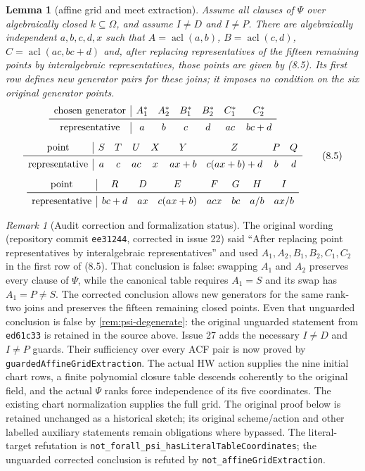 \documentclass[11pt,oneside]{article}
\newtheorem{lemma}[theorem]{Lemma}
\theoremstyle{definition}
\theoremstyle{remark}
\newtheorem{remark}[theorem]{Remark}
\newcommand{\acl}{\operatorname{acl}}
\newcommand{\lean}[1]{\nolinkurl{#1}}
\begin{document}
\begin{lemma}[affine grid and meet extraction]\label{lem:affine-grid-extraction}
Assume all clauses of $\Psi$ over algebraically closed $k\subseteq\Omega$,
and assume $I\ne D$ and $I\ne P$.
There are algebraically independent $a,b,c,d,x$ such that
$A=\acl(a,b)$, $B=\acl(c,d)$, $C=\acl(ac,bc+d)$ and, after replacing
representatives of the fifteen remaining points by interalgebraic representatives,
those points are given by (8.5).  Its first row defines new generator pairs for
these joins; it imposes no condition on the six original generator points.
\[
\begin{gathered}
\begin{array}{c|cccccc}
\text{chosen generator}&A_1^*&A_2^*&B_1^*&B_2^*&C_1^*&C_2^*\\ \midrule
\text{representative}&a&b&c&d&ac&bc+d
\end{array}\\[1.5mm]
\begin{array}{c|cccccccc}
\text{point}&S&T&U&X&Y&Z&P&Q\\ \midrule
\text{representative}&a&c&ac&x&ax+b&c(ax+b)+d&b&d
\end{array}\\[1.5mm]
\begin{array}{c|ccccccc}
\text{point}&R&D&E&F&G&H&I\\ \midrule
\text{representative}&bc+d&ax&c(ax+b)&acx&bc&a/b&ax/b
\end{array}
\end{gathered}                                                   \tag{8.5}
\]
\end{lemma}
\begin{remark}[Audit correction and formalization status]
The original wording (repository commit \texttt{ee31244}, corrected in issue 22)
said ``After replacing point representatives by interalgebraic representatives''
and used $A_1,A_2,B_1,B_2,C_1,C_2$ in the first row of (8.5).
That conclusion is false: swapping $A_1$ and $A_2$ preserves every clause of $\Psi$,
while the canonical table requires $A_1=S$ and its swap has $A_1=P\ne S$.
The corrected conclusion allows new generators for the same rank-two joins and
preserves the fifteen remaining closed points.  Even that unguarded conclusion is
false by \cref{rem:psi-degenerate}: the original unguarded statement from
\texttt{ed61c33} is retained in the source above.  Issue 27 adds the necessary
$I\ne D$ and $I\ne P$ guards.  Their sufficiency over every ACF pair is now proved by
\lean{guardedAffineGridExtraction}.  The actual HW action supplies the nine initial chart
rows, a finite polynomial closure table descends coherently to the original field, and
the actual $\Psi$ ranks force independence of its five coordinates.  The existing chart
normalization supplies the full grid.  The original proof below is retained unchanged
as a historical sketch; its original scheme/action and other labelled auxiliary
statements remain obligations where bypassed.
The literal-target refutation is \texttt{not\_forall\_psi\_hasLiteralTableCoordinates};
the unguarded corrected conclusion is refuted by \lean{not_affineGridExtraction}.
\end{remark}
\end{document}
